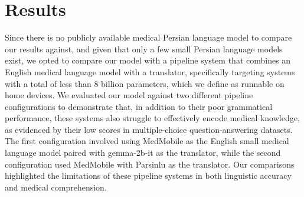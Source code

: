 \documentclass[conference]{IEEEtran}
\begin{document}
\section{Results}
Since there is no publicly available medical Persian language model to compare our results against, and given that only a few small Persian language models exist, we opted to compare our model with a pipeline system that combines an English medical language model with a translator, specifically targeting systems with a total of less than 8 billion parameters, which we define as runnable on home devices. We evaluated our model against two different pipeline configurations to demonstrate that, in addition to their poor grammatical performance, these systems also struggle to effectively encode medical knowledge, as evidenced by their low scores in multiple-choice question-answering datasets. The first configuration involved using MedMobile
\cite{b9}
as the English small medical language model paired with gemma-2b-it
\cite{b14}
as the translator, while the second configuration used MedMobile with Parsinlu
\cite{b15}
\cite{b16}
as the translator. Our comparisons highlighted the limitations of these pipeline systems in both linguistic accuracy and medical comprehension.
\end{document}

